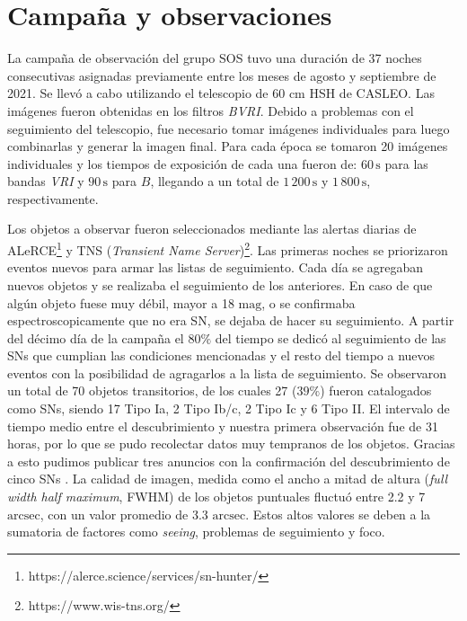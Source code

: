\documentclass[baaa]{baaa}
\begin{document}
\section{Campaña y observaciones} \label{sec:campaña}
La campaña de observación del grupo SOS tuvo una duración de 37 noches consecutivas asignadas previamente entre los meses de agosto y septiembre de 2021. Se llevó a cabo utilizando el telescopio de 60 cm HSH de CASLEO. Las imágenes fueron obtenidas en los filtros \textit{BVRI}. Debido a problemas con el seguimiento del telescopio, fue necesario tomar imágenes individuales para luego combinarlas y generar la imagen final. Para cada época se tomaron 20 imágenes individuales y los tiempos de exposición de cada una fueron de: $60 \, \mathrm{s}$ para las bandas \textit{VRI} y $90 \, \mathrm{s}$ para $B$, llegando a un total de $1 \, 200 \, \mathrm{s}$ y $1 \, 800 \, \mathrm{s}$, respectivamente. 

Los objetos a observar fueron seleccionados mediante las alertas diarias de ALeRCE\footnote{https://alerce.science/services/sn-hunter/} \citep{ALERCE} y TNS (\textit{Transient Name Server})\footnote{https://www.wis-tns.org/}. Las primeras noches se priorizaron eventos nuevos para armar las listas de seguimiento. Cada día se agregaban nuevos objetos y se realizaba el seguimiento de los anteriores. En caso de que algún objeto fuese muy débil, mayor a 18 $\mathrm{mag}$, o se confirmaba espectroscopicamente que no era SN, se dejaba de hacer su seguimiento. A partir del décimo día de la campaña el 80$\%$ del tiempo se dedicó al seguimiento de las SNs que cumplian las condiciones mencionadas y el resto del tiempo a nuevos eventos con la posibilidad de agragarlos a la lista de seguimiento. Se observaron un total de 70 objetos transitorios, de los cuales 27 ($39 \%$) fueron catalogados como SNs, siendo 17 Tipo Ia, 2 Tipo Ib/c, 2 Tipo Ic y 6 Tipo II. El intervalo de tiempo medio entre el descubrimiento y nuestra primera observación fue de 31 horas, por lo que se pudo recolectar datos muy tempranos de los objetos. Gracias a esto pudimos publicar tres anuncios con la confirmación del descubrimiento de cinco SNs \citep{2021Ertini,2021Martinez,2021Pessi}. La calidad de imagen, medida como el ancho a mitad de altura ({\em full width half maximum}, FWHM) de los objetos puntuales fluctuó entre 2.2 y 7 $\mathrm{arcsec}$, con un valor promedio de 3.3 $\mathrm{arcsec}$. Estos altos valores se deben a la sumatoria de factores como {\em seeing}, problemas de seguimiento y foco.
\end{document}
